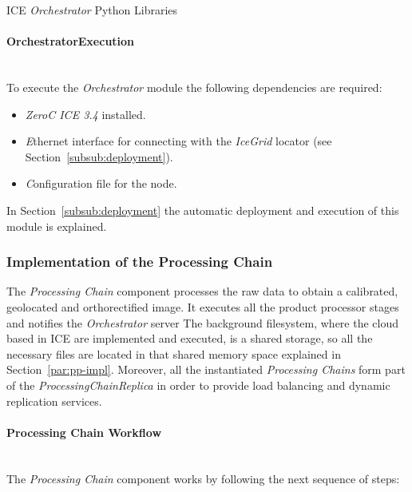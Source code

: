 \begin{table}[hp]
  \centering
  {\small
  
  }
  \caption{ICE \emph{Orchestrator} Python Libraries}
  \label{table:orches-second-libraries}
\end{table}

\paragraph{OrchestratorExecution}~\\

To execute the \emph{Orchestrator} module the following dependencies
are required:
\begin{itemize}
\item \emph{ZeroC ICE 3.4} installed.
\item \emph Ethernet interface for connecting with the \emph{IceGrid} locator (see Section~\ref{subsub:deployment}).
\item \emph Configuration file for the node.
\end{itemize}
 In Section~\ref{subsub:deployment} the
  automatic deployment and execution of this module is explained. 

\subsubsection{Implementation of the  Processing Chain}

The \emph{Processing Chain} component processes the raw data to obtain a calibrated,
geolocated and orthorectified image. It executes all the product processor stages and notifies the
\emph{Orchestrator} server The background filesystem, where the cloud based in
ICE are implemented and executed, is a shared storage, so all the necessary files are
located in that shared memory space  explained in Section~\ref{par:pp-impl}. Moreover, all the instantiated \emph{Processing Chains} form part of the
\emph{ProcessingChainReplica} in order to provide load balancing and dynamic
replication services. 


\paragraph{Processing Chain Workflow}~\\

The \emph{Processing Chain} component works by following the next sequence of steps:


